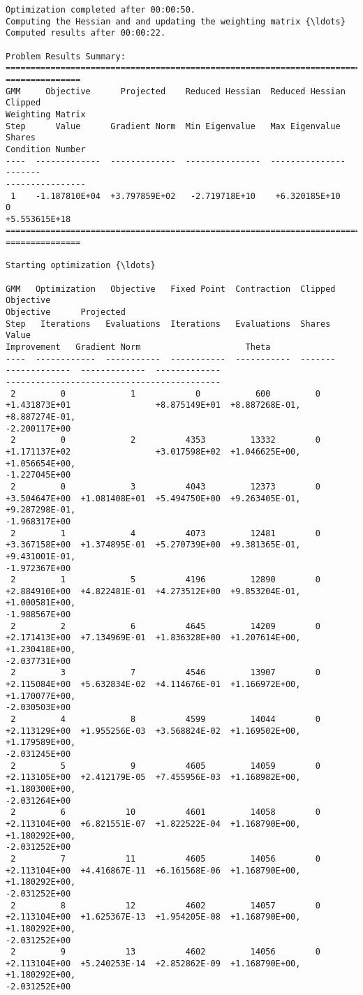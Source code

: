 \begin{Verbatim}[commandchars=\\\{\}]
Optimization completed after 00:00:50.
Computing the Hessian and and updating the weighting matrix {\ldots}
Computed results after 00:00:22.

Problem Results Summary:
================================================================================
===============
GMM     Objective      Projected    Reduced Hessian  Reduced Hessian  Clipped
Weighting Matrix
Step      Value      Gradient Norm  Min Eigenvalue   Max Eigenvalue   Shares
Condition Number
----  -------------  -------------  ---------------  ---------------  -------
----------------
 1    -1.187810E+04  +3.797859E+02   -2.719718E+10    +6.320185E+10      0
+5.553615E+18
================================================================================
===============

Starting optimization {\ldots}

GMM   Optimization   Objective   Fixed Point  Contraction  Clipped    Objective
Objective      Projected
Step   Iterations   Evaluations  Iterations   Evaluations  Shares       Value
Improvement   Gradient Norm                     Theta
----  ------------  -----------  -----------  -----------  -------
-------------  -------------  -------------
-------------------------------------------
 2         0             1            0           600         0
+1.431873E+01                 +8.875149E+01  +8.887268E-01, +8.887274E-01,
-2.200117E+00
 2         0             2          4353         13332        0
+1.171137E+02                 +3.017598E+02  +1.046625E+00, +1.056654E+00,
-1.227045E+00
 2         0             3          4043         12373        0
+3.504647E+00  +1.081408E+01  +5.494750E+00  +9.263405E-01, +9.287298E-01,
-1.968317E+00
 2         1             4          4073         12481        0
+3.367158E+00  +1.374895E-01  +5.270739E+00  +9.381365E-01, +9.431001E-01,
-1.972367E+00
 2         1             5          4196         12890        0
+2.884910E+00  +4.822481E-01  +4.273512E+00  +9.853204E-01, +1.000581E+00,
-1.988567E+00
 2         2             6          4645         14209        0
+2.171413E+00  +7.134969E-01  +1.836328E+00  +1.207614E+00, +1.230418E+00,
-2.037731E+00
 2         3             7          4546         13907        0
+2.115084E+00  +5.632834E-02  +4.114676E-01  +1.166972E+00, +1.170077E+00,
-2.030503E+00
 2         4             8          4599         14044        0
+2.113129E+00  +1.955256E-03  +3.568824E-02  +1.169502E+00, +1.179589E+00,
-2.031245E+00
 2         5             9          4605         14059        0
+2.113105E+00  +2.412179E-05  +7.455956E-03  +1.168982E+00, +1.180300E+00,
-2.031264E+00
 2         6            10          4601         14058        0
+2.113104E+00  +6.821551E-07  +1.822522E-04  +1.168790E+00, +1.180292E+00,
-2.031252E+00
 2         7            11          4605         14056        0
+2.113104E+00  +4.416867E-11  +6.161568E-06  +1.168790E+00, +1.180292E+00,
-2.031252E+00
 2         8            12          4602         14057        0
+2.113104E+00  +1.625367E-13  +1.954205E-08  +1.168790E+00, +1.180292E+00,
-2.031252E+00
 2         9            13          4602         14056        0
+2.113104E+00  +5.240253E-14  +2.852862E-09  +1.168790E+00, +1.180292E+00,
-2.031252E+00


\end{Verbatim}
